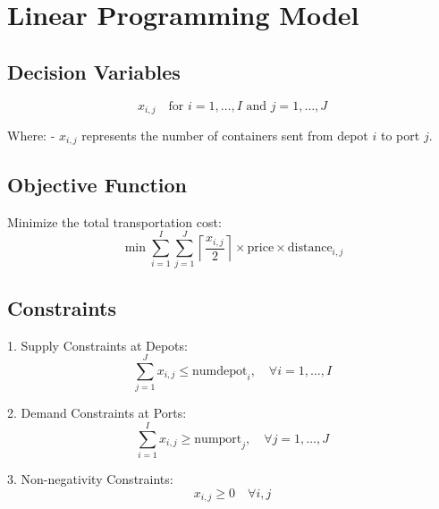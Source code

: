 \documentclass{article}
\begin{document}
\section*{Linear Programming Model}

\subsection*{Decision Variables}
\[
x_{i,j} \quad \text{for } i = 1, \ldots, I \text{ and } j = 1, \ldots, J
\]

Where:
- \( x_{i,j} \) represents the number of containers sent from depot \( i \) to port \( j \).

\subsection*{Objective Function}
Minimize the total transportation cost:
\[
\min \sum_{i=1}^{I} \sum_{j=1}^{J} \left\lceil \frac{x_{i,j}}{2} \right\rceil \times \text{price} \times \text{distance}_{i,j}
\]

\subsection*{Constraints}
1. Supply Constraints at Depots:
   \[
   \sum_{j=1}^{J} x_{i,j} \leq \text{numdepot}_{i}, \quad \forall i = 1, \ldots, I
   \]

2. Demand Constraints at Ports:
   \[
   \sum_{i=1}^{I} x_{i,j} \geq \text{numport}_{j}, \quad \forall j = 1, \ldots, J
   \]

3. Non-negativity Constraints:
   \[
   x_{i,j} \geq 0 \quad \forall i, j
   \]
\end{document}

